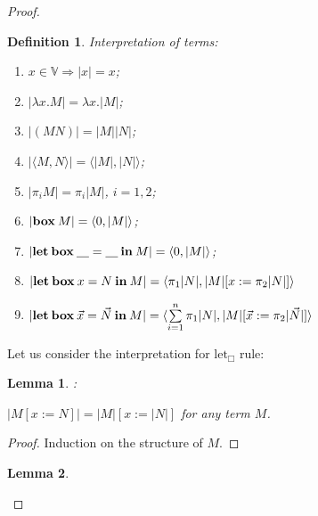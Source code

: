 \documentclass[a4paper]{article}
\newtheorem{lemma}{Lemma}
\newtheorem{defin}{Definition}
\begin{document}
\begin{proof}
  \begin{defin} Interpretation of terms:
    \begin{enumerate}
      \item $x \in \mathbb{V} \Rightarrow |x| = x$;
      \item $|\lambda x. M| = \lambda x. |M|$;
      \item $|(M N)| = |M| |N|$;
      \item $|\langle M, N \rangle| = \langle |M|, |N| \rangle$;
      \item $|\pi_i M| = \pi_i |M|$, $i = 1, 2$;
      \item $|{\bf box \:} M| = \langle 0, |M| \rangle$;
      \item $|{\bf let \: box \:} \underline{\quad} = \underline{\quad} {\: \bf in \:} M| = \langle 0, |M| \rangle$;
      \item $|{\bf let \: box \:} x = N {\: \bf in \:} M| = \langle \pi_1 |N| , |M| [x := \pi_2 |N|] \rangle$
      \item $|{\bf let \: box \:} \vec{x} = \vec{N} {\: \bf in \:} M| = \langle \sum \limits_{i = 1}^n \pi_1 |N|, |M| [\vec{x} := \pi_2 |\vec{N}|] \rangle$
    \end{enumerate}
  \end{defin}

  Let us consider the interpretation for $\text{let}_{\Box}$ rule:

  \begin{prooftree}
  \end{prooftree}

  \begin{lemma}:

    $|M [x := N]| = |M| [x := |N|]$ for any term $M$.
  \end{lemma}

  \begin{proof}

    Induction on the structure of $M$.
  \end{proof}

  \begin{lemma}


\end{lemma}
\end{proof}
\end{document}

